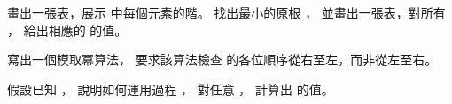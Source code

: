 \startsection[
  title={Powers of an element},
]

\startEXERCISE
畫出一張表，展示  中每個元素的階。
找出最小的原根 ，
並畫出一張表，對所有 ，
給出相應的  的值。
\stopEXERCISE

\startANSWER
{}
\stopANSWER

\startEXERCISE
寫出一個模取冪算法，
要求該算法檢查  的各位順序從右至左，而非從左至右。
\stopEXERCISE

\startANSWER
{}
\stopANSWER

\startEXERCISE
假設已知 ，
說明如何運用過程 ，
對任意 ，
計算出  的值。
\stopEXERCISE

\startANSWER
{}
\stopANSWER

\stopsection
